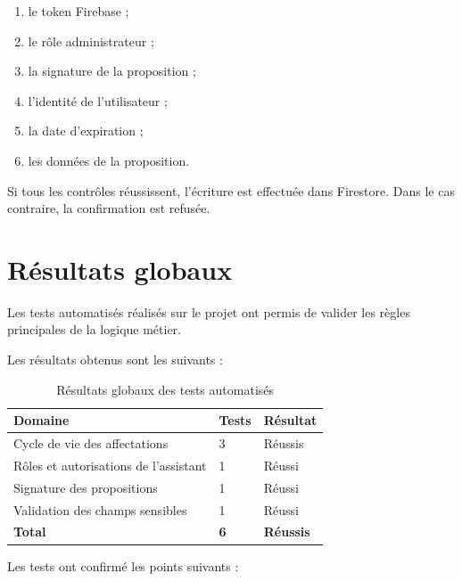 \documentclass{rapportENSIAS}
\begin{document}
\begin{enumerate}
    \item le token Firebase ;
    \item le rôle administrateur ;
    \item la signature de la proposition ;
    \item l’identité de l’utilisateur ;
    \item la date d’expiration ;
    \item les données de la proposition.
\end{enumerate}

Si tous les contrôles réussissent, l’écriture est effectuée dans Firestore. Dans le cas contraire, la confirmation est refusée.

\section{Résultats globaux}

Les tests automatisés réalisés sur le projet ont permis de valider les règles principales de la logique métier.

Les résultats obtenus sont les suivants :

\begin{table}[H]
    \centering
    \caption{Résultats globaux des tests automatisés}
    \label{tab:resultats-globaux}
    \begin{tabular}{|p{7cm}|p{3cm}|p{3cm}|}
        \hline
        \textbf{Domaine} & \textbf{Tests} & \textbf{Résultat} \\
        \hline
        Cycle de vie des affectations & 3 & Réussis \\
        \hline
        Rôles et autorisations de l’assistant & 1 & Réussi \\
        \hline
        Signature des propositions & 1 & Réussi \\
        \hline
        Validation des champs sensibles & 1 & Réussi \\
        \hline
        \textbf{Total} & \textbf{6} & \textbf{Réussis} \\
        \hline
    \end{tabular}
\end{table}

Les tests ont confirmé les points suivants :
\end{document}
